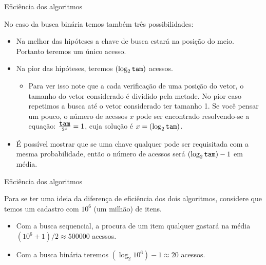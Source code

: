 \documentclass[handout]{beamer}
\newcommand{\cod}[1]{\texttt{#1}}
\begin{document}
\begin{frame}[fragile]{Eficiência dos algoritmos}

    No caso da busca binária temos também três possibilidades:

    \begin{itemize}
        \item Na melhor das hipóteses a chave de busca estará na posição do meio. Portanto teremos um único acesso.
        \item Na pior das hipóteses, teremos $(\log_2 \mbox{\cod{tam}})$ acessos.
        \begin{itemize}
            \item Para ver isso note que a cada verificação de uma posição do vetor, o tamanho do vetor considerado é dividido pela metade.
            No pior caso repetimos a busca até o vetor considerado ter tamanho 1. 
            Se você pensar um pouco, o número de acessos $x$ pode ser encontrado resolvendo-se a equação: $\frac{\mbox{\cod{tam}}}{2^x} = 1$, cuja solução é $x = (\log_2 \mbox{\cod{tam}})$.
        \end{itemize}
        \item É possível mostrar que se uma chave qualquer pode ser requisitada com a mesma probabilidade, então o número de acessos será $(\log_2 \mbox{\cod{tam}}) -1$ em média.
    \end{itemize}

\end{frame}

\begin{frame}[fragile]{Eficiência dos algoritmos}

    Para se ter uma ideia da diferença de eficiência dos dois algoritmos, considere que temos um cadastro com $10^6$ (um milhão) de itens.

    \begin{itemize}
        \item Com a busca sequencial, a procura de um item qualquer gastará na média $(10^6 + 1)/2 \approx 500000$ acessos.
        \item Com a busca binária teremos $(\log_2 10^6) -1 \approx 20$ acessos.
    \end{itemize}

\end{frame}
\end{document}
